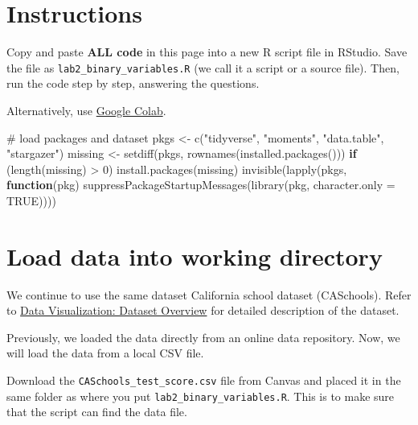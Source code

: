 \documentclass[
  12pt,
  letterpaper,
]{scrbook}
\newenvironment{Shaded}{\begin{snugshade}}{\end{snugshade}}
\newcommand{\AttributeTok}[1]{\textcolor[rgb]{0.40,0.45,0.13}{#1}}
\newcommand{\CommentTok}[1]{\textcolor[rgb]{0.37,0.37,0.37}{#1}}
\newcommand{\ConstantTok}[1]{\textcolor[rgb]{0.56,0.35,0.01}{#1}}
\newcommand{\ControlFlowTok}[1]{\textcolor[rgb]{0.00,0.23,0.31}{\textbf{#1}}}
\newcommand{\DecValTok}[1]{\textcolor[rgb]{0.68,0.00,0.00}{#1}}
\newcommand{\FunctionTok}[1]{\textcolor[rgb]{0.28,0.35,0.67}{#1}}
\newcommand{\NormalTok}[1]{\textcolor[rgb]{0.00,0.23,0.31}{#1}}
\newcommand{\OtherTok}[1]{\textcolor[rgb]{0.00,0.23,0.31}{#1}}
\newcommand{\SpecialCharTok}[1]{\textcolor[rgb]{0.37,0.37,0.37}{#1}}
\newcommand{\StringTok}[1]{\textcolor[rgb]{0.13,0.47,0.30}{#1}}
\theoremstyle{definition}
\theoremstyle{plain}
\theoremstyle{remark}
\begin{document}
\section{Instructions}\label{instructions-1}

Copy and paste \textbf{ALL code} in this page into a new R script file
in RStudio. Save the file as \texttt{lab2\_binary\_variables.R} (we call
it a script or a source file). Then, run the code step by step,
answering the questions.

Alternatively, use
\href{https://colab.research.google.com/drive/1EcWkJfhHJOhDEHXaZgu3_f66pnlEum5R?usp=share_link}{Google
Colab}.

\begin{Shaded}
\begin{Highlighting}[]
\CommentTok{\# load packages and dataset}
\NormalTok{pkgs }\OtherTok{\textless{}{-}} \FunctionTok{c}\NormalTok{(}\StringTok{"tidyverse"}\NormalTok{, }\StringTok{"moments"}\NormalTok{, }\StringTok{"data.table"}\NormalTok{, }\StringTok{"stargazer"}\NormalTok{)}
\NormalTok{missing }\OtherTok{\textless{}{-}} \FunctionTok{setdiff}\NormalTok{(pkgs, }\FunctionTok{rownames}\NormalTok{(}\FunctionTok{installed.packages}\NormalTok{()))}
\ControlFlowTok{if}\NormalTok{ (}\FunctionTok{length}\NormalTok{(missing) }\SpecialCharTok{\textgreater{}} \DecValTok{0}\NormalTok{) }\FunctionTok{install.packages}\NormalTok{(missing)}
\FunctionTok{invisible}\NormalTok{(}\FunctionTok{lapply}\NormalTok{(pkgs, }\ControlFlowTok{function}\NormalTok{(pkg) }\FunctionTok{suppressPackageStartupMessages}\NormalTok{(}\FunctionTok{library}\NormalTok{(pkg, }\AttributeTok{character.only =} \ConstantTok{TRUE}\NormalTok{))))}
\end{Highlighting}
\end{Shaded}

\section{Load data into working
directory}\label{load-data-into-working-directory}

We continue to use the same dataset California school dataset
(CASchools). Refer to \hyperref[dataset-overview]{Data Visualization:
Dataset Overview} for detailed description of the dataset.

Previously, we loaded the data directly from an online data repository.
Now, we will load the data from a local CSV file.

Download the \texttt{CASchools\_test\_score.csv} file from Canvas and
placed it in the same folder as where you put
\texttt{lab2\_binary\_variables.R}. This is to make sure that the script
can find the data file.
\end{document}
